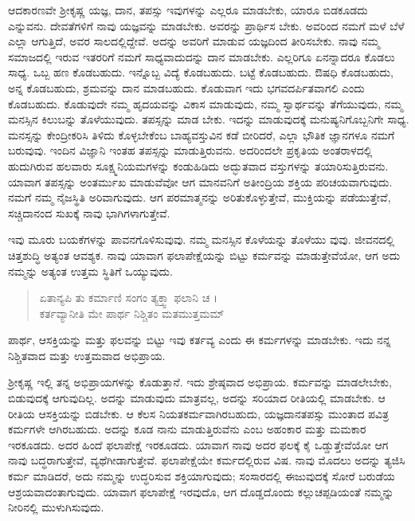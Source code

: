 ಆದಕಾರಣವೇ ಶ್ರೀಕೃಷ್ಣ ಯಜ್ಞ, ದಾನ, ತಪಸ್ಸು ಇವುಗಳನ್ನು ಎಲ್ಲರೂ ಮಾಡಬೇಕು, ಯಾರೂ ಬಿಡಕೂಡದು ಎನ್ನುವನು. ದೇವತೆಗಳಿಗೆ ನಾವು ಯಜ್ಞವನ್ನು ಮಾಡಬೇಕು. ಅವರನ್ನು ಪ್ರಾರ್ಥಿಸ ಬೇಕು. ಅವರಿಂದ ನಮಗೆ ಮಳೆ ಬೆಳೆ ಎಲ್ಲಾ ಆಗುತ್ತಿದೆ, ಅವರ ಸಾಲದಲ್ಲಿದ್ದೇವೆ. ಅದನ್ನು ಅವರಿಗೆ ಮಾಡುವ ಯಜ್ಞದಿಂದ ತೀರಿಸಬೇಕು. ನಾವು ನಮ್ಮ ಸಮಾಜದಲ್ಲಿ ಇರುವ ಇತರರಿಗೆ ನಮಗೆ ಸಾಧ್ಯವಾದುದನ್ನು ದಾನ ಮಾಡಬೇಕು. ಎಲ್ಲರಿಗೂ ಏನನ್ನಾದರೂ ಕೊಡಲು ಸಾಧ್ಯ. ಒಬ್ಬ ಹಣ ಕೊಡಬಹುದು. ಇನ್ನೊಬ್ಬ ವಿದ್ಯೆ ಕೊಡಬಹುದು. ಬಟ್ಟೆ ಕೊಡಬಹುದು. ಔಷಧಿ ಕೊಡಬಹುದು, ಅನ್ನ ಕೊಡಬಹುದು, ಶ್ರಮವನ್ನು ದಾನ ಮಾಡಬಹುದು. ಕೊಡುವಾಗ ಇದು ಭಗವದರ್ಪಿತವಾಗಲಿ ಎಂದು ಕೊಡಬಹುದು. ಕೊಡುವುದೇ ನಮ್ಮ ಹೃದಯವನ್ನು ವಿಕಾಸ ಮಾಡುವುದು, ನಮ್ಮ ಸ್ವಾರ್ಥವನ್ನು ತೆಗೆಯುವುದು, ನಮ್ಮ ಮನಸ್ಸಿನ ಕಿಲುಬನ್ನು ತೊಳೆಯುವುದು. ತಪಸ್ಸನ್ನು ಮಾಡ ಬೇಕು. ಇದನ್ನು ಮಾಡುವುದಕ್ಕೆ ಮನುಷ್ಯನಿಗೊಬ್ಬನಿಗೇ ಸಾಧ್ಯ. ಮನಸ್ಸನ್ನು ಕೇಂದ್ರೀಕರಿಸಿ ತಿಳಿದು ಕೊಳ್ಳಬೇಕೆಂಬ ಬಾಹ್ಯವಸ್ತುವಿನ ಕಡೆ ಬೀರಿದರೆ, ಎಲ್ಲಾ ಭೌತಿಕ ಜ್ಞಾನಗಳೂ ನಮಗೆ ಬರುವುವು. ಇಂದಿನ ವಿಜ್ಞಾನಿ ಇಂತಹ ತಪಸ್ಸನ್ನು ಮಾಡುತ್ತಿರುವನು. ಅದರಿಂದಲೇ ಪ್ರಕೃತಿಯ ಅಂತರಾಳದಲ್ಲಿ ಹುದುಗಿರುವ ಹಲವಾರು ಸೂಕ್ಷ್ಮನಿಯಮಗಳನ್ನು ಕಂಡುಹಿಡಿದು ಅದ್ಭುತವಾದ ವಸ್ತುಗಳನ್ನು ತಯಾರಿಸುತ್ತಿರುವನು. ಯಾವಾಗ ತಪಸ್ಸನ್ನು ಅಂತರ್ಮುಖ ಮಾಡುವೆವೋ ಆಗ ಮಾನವನಿಗೆ ಅತೀಂದ್ರಿಯ ಶಕ್ತಿಯ ಪರಿಚಯವಾಗುವುದು. ನಮಗೆ ನಮ್ಮ ನೈಜಸ್ಥಿತಿ ಅರಿವಾಗುವುದು. ಆಗ ಪರಮಾತ್ಮನನ್ನು ಅರಿತುಕೊಳ್ಳುತ್ತೇವೆ, ಮುಕ್ತಿಯನ್ನು ಪಡೆಯುತ್ತೇವೆ, ಸಚ್ಚಿದಾನಂದ ಸುಖಕ್ಕೆ ನಾವು ಭಾಗಿಗಳಾಗುತ್ತೇವೆ.

ಇವು ಮೂರು ಬಯಕೆಗಳನ್ನು ಪಾವನಗೊಳಿಸುವುವು. ನಮ್ಮ ಮನಸ್ಸಿನ ಕೊಳೆಯನ್ನು ತೊಳೆಯು ವುವು. ಜೀವನದಲ್ಲಿ ಚಿತ್ತಶುದ್ಧಿ ಅತ್ಯಂತ ಆವಶ್ಯಕ. ನಾವು ಯಾವಾಗ ಫಲಾಪೇಕ್ಷೆಯನ್ನು ಬಿಟ್ಟು ಕರ್ಮವನ್ನು ಮಾಡುತ್ತೇವೆಯೋ, ಆಗ ಅದು ನಮ್ಮನ್ನು ಅತ್ಯಂತ ಉತ್ತಮ ಸ್ಥಿತಿಗೆ ಒಯ್ಯುವುದು.

\begin{verse}
ಏತಾನ್ಯಪಿ ತು ಕರ್ಮಾಣಿ ಸಂಗಂ ತ್ಯಕ್ತ್ವಾ ಫಲಾನಿ ಚ ।\\ಕರ್ತವ್ಯಾನೀತಿ ಮೇ ಪಾರ್ಥ ನಿಶ್ಚಿತಂ ಮತಮುತ್ತಮಮ್ 
\end{verse}

{\small ಪಾರ್ಥ, ಆಸಕ್ತಿಯನ್ನು ಮತ್ತು ಫಲವನ್ನು ಬಿಟ್ಟು ಇವು ಕರ್ತವ್ಯ ಎಂದು ಈ ಕರ್ಮಗಳನ್ನು ಮಾಡಬೇಕು. ಇದು ನನ್ನ ನಿಶ್ಚಿತವಾದ ಮತ್ತು ಉತ್ತಮವಾದ ಅಭಿಪ್ರಾಯ.}

ಶ್ರೀಕೃಷ್ಣ ಇಲ್ಲಿ ತನ್ನ ಅಭಿಪ್ರಾಯಗಳನ್ನು ಕೊಡುತ್ತಾನೆ. ಇದು ಶ್ರೇಷ್ಠವಾದ ಅಭಿಪ್ರಾಯ. ಕರ್ಮವನ್ನು ಮಾಡಲೇಬೇಕು, ಬಿಡುವುದಕ್ಕೆ ಆಗುವುದಿಲ್ಲ. ಅದನ್ನು ಮಾಡುವುದು ಮಾತ್ರವಲ್ಲ, ಅದನ್ನು ಸರಿಯಾದ ರೀತಿಯಲ್ಲಿ ಮಾಡಬೇಕು. ಆ ರೀತಿಯ ಆಸಕ್ತಿಯನ್ನು ಬಿಡಬೇಕು. ಆ ಕೆಲಸ ನಿಯತಕರ್ಮವಾಗಿರಬಹುದು, ಯಜ್ಞದಾನತಪಸ್ಸು ಮುಂತಾದ ಪವಿತ್ರ ಕರ್ಮಗಳೇ ಆಗಿರಬಹುದು. ಅದನ್ನು ಕೂಡ ನಾನು ಮಾಡುತ್ತಿರುವೆನು ಎಂಬ ಅಹಂಕಾರ ಮತ್ತು ಮಮಕಾರ ಇರಕೂಡದು. ಅದರ ಹಿಂದೆ ಫಲಾಪೇಕ್ಷೆ ಇರಕೂಡದು. ಯಾವಾಗ ನಾವು ಅದರ ಫಲಕ್ಕೆ ಕೈ ಒಡ್ಡುತ್ತೇವೆಯೋ ಆಗ ನಾವು ಬದ್ಧರಾಗುತ್ತೇವೆ, ವ್ಯಥೆಗೀಡಾಗುತ್ತೇವೆ. ಫಲಾಪೇಕ್ಷೆಯೇ ಕರ್ಮದಲ್ಲಿರುವ ವಿಷ. ನಾವು ಮೊದಲು ಅದನ್ನು ತ್ಯಜಿಸಿ ಕರ್ಮ ಮಾಡಿದರೆ, ಅದು ನಮ್ಮನ್ನು ಉದ್ಧರಿಸುವ ಶಕ್ತಿಯಾಗುವುದು; ಸಂಸಾರದಲ್ಲಿ ಈಜುವುದಕ್ಕೆ ಸೋರೆ ಬರುಡೆಯ ಆಶ್ರಯವಾದಂತಾಗುವುದು. ಯಾವಾಗ ಫಲಾಪೇಕ್ಷೆ ಇರವುದೊ, ಆಗ ದೊಡ್ಡದೊಂದು ಕಲ್ಲುಚಪ್ಪಡಿಯಂತೆ ನಮ್ಮನ್ನು ನೀರಿನಲ್ಲಿ ಮುಳುಗಿಸುವುದು.


